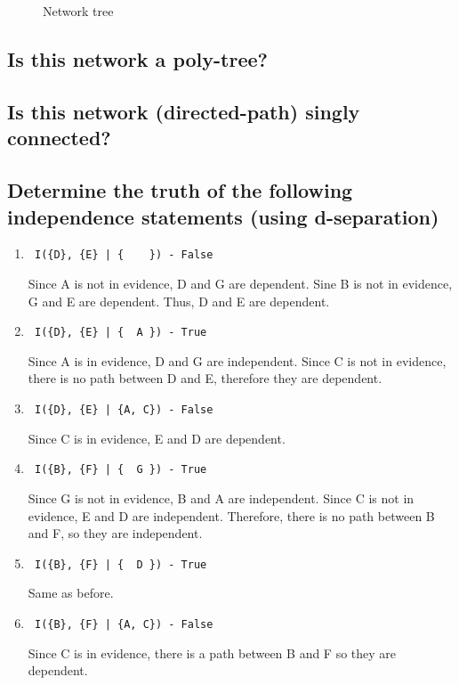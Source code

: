 \documentclass{article}                     %
\newcommand{\relation}[3][]
{
	\path [draw=blue, ->,#1] (#2) -- (#3);
}
\newcommand{\mynode}[3][]{
	\node [draw, circle] (#1) at (#2, #3) {#1};
}
\begin{document}
	\section{}
	\begin{figure}
		\centering
		\caption{Network tree}
		\label{fig:bn2}
	\end{figure}
	\subsection{Is this network a poly-tree?}
	\subsection{Is this network (directed-path) singly connected?}
	\subsection{Determine the truth of the following independence statements (using d-separation)}
	\begin{enumerate}		
		\item \begin{verbatim} I({D}, {E} | {    }) - False \end{verbatim}
		Since A is not in evidence, D and G are dependent. Sine B is not in evidence, G and E are dependent. Thus, D and E are dependent.
		\item \begin{verbatim} I({D}, {E} | {  A }) - True \end{verbatim}
		Since A is in evidence, D and G are independent. Since C is not in evidence, there is no path between D and E, therefore they are dependent.
		\item \begin{verbatim} I({D}, {E} | {A, C}) - False \end{verbatim}
		Since C is in evidence, E and D are dependent. 
		\item \begin{verbatim} I({B}, {F} | {  G }) - True \end{verbatim}
		Since G is not in evidence, B and A are independent. Since C is not in evidence, E and D are independent. Therefore, there is no path between B and F, so they are independent.
		\item \begin{verbatim} I({B}, {F} | {  D }) - True \end{verbatim}
		Same as before.
		\item \begin{verbatim} I({B}, {F} | {A, C}) - False \end{verbatim}
		Since C is in evidence, there is a path between B and F so they are dependent.

	\end{enumerate}
\end{document}
